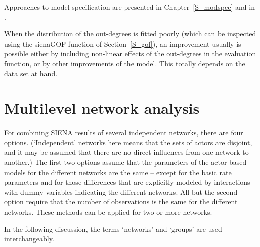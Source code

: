 \documentclass[a4paper,fleqn,11pt]{article}
\newcommand{\+}{\, + \,}
\newcommand{\sfn}[1]{\textsf{#1}}
\newcommand{\SI}{{\sf SIENA }}
\begin{document}
Approaches to model specification are presented in Chapter~\ref{S_modspec}
and in \citet*{SnijdersEA10b}.

When the distribution of the out-degrees is fitted poorly
(which can be inspected using the \sfn{sienaGOF} function
of Section~\ref{S_gof}), an improvement
usually is possible either by including non-linear effects of the
out-degrees in the evaluation function, or by other improvements of the model.
This totally depends on the data set at hand.


\newpage
\section{Multilevel network analysis}
\label{S_mulev}

For combining \SI results of several independent networks,
there are four options.
(`Independent'  networks here means that the sets of actors are
disjoint, and it may be assumed that there are no direct influences
from one network to another.)
The first two options assume that the parameters
of the actor-based models for the different
networks are the same -- except
for the basic rate parameters and for
those differences that are explicitly modeled by interactions
with dummy variables indicating the different networks.
All but the second option require that the number of observations
is the same for the different networks.
These methods can be applied for two or more networks.
\medskip

In the following discussion,
the terms `networks' and `groups' are used interchangeably.
\end{document}
